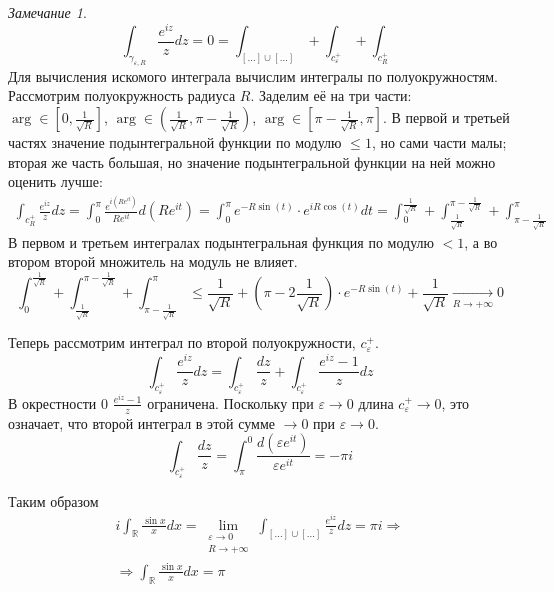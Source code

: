 \documentclass[12pt]{article}
\newcommand{\R}{\mathbb{R}}
\newcommand{\union}{\cup}
\newcommand{\Ra}{\Rightarrow}
\theoremstyle{thmnote}
\theoremstyle{remark}
\newtheorem*{remark}{Замечание}
\theoremstyle{defnote}
\begin{document}
\begin{remark}
    \begin{equation*}
        \int_{\gamma_{\varepsilon, R}} \frac{e^{iz}}{z} dz = 0 = \int_{[\hdots] \union [\hdots]} + \int_{c_\varepsilon^+} + \int_{c_R^+}
    \end{equation*}
    Для вычисления искомого интеграла вычислим интегралы по полуокружностям. Рассмотрим полуокружность радиуса $R$. Заделим её на три части: $\arg \in [0, \frac{1}{\sqrt{R}}]$, $\arg \in (\frac{1}{\sqrt{R}}, \pi - \frac{1}{\sqrt{R}})$, $\arg \in [\pi - \frac{1}{\sqrt{R}}, \pi]$. В первой и третьей частях значение подынтегральной функции по модулю $\leq 1$, но сами части малы; вторая же часть большая, но значение подынтегральной функции на ней можно оценить лучше:
    \begin{gather*}
        \int_{c_R^+} \frac{e^{iz}}{z} dz = \int_{0}^{\pi} \frac{e^{i(Re^{it})}}{Re^{it}} d(Re^{it}) = \int_{0}^{\pi} e^{-R \sin(t)} \cdot e^{iR \cos(t)} dt = \int_{0}^{\frac{1}{\sqrt{R}}} + \int_{\frac{1}{\sqrt{R}}}^{\pi - \frac{1}{\sqrt{R}}} + \int_{\pi - \frac{1}{\sqrt{R}}}^{\pi}
    \end{gather*}
    В первом и третьем интегралах подынтегральная функция по модулю $<1$, а во втором второй множитель на модуль не влияет.
    \begin{equation*}
        \int_{0}^{\frac{1}{\sqrt{R}}} + \int_{\frac{1}{\sqrt{R}}}^{\pi - \frac{1}{\sqrt{R}}} + \int_{\pi - \frac{1}{\sqrt{R}}}^{\pi} \leq \frac{1}{\sqrt{R}} + \left(\pi - 2 \frac{1}{\sqrt{R}}\right) \cdot e^{-R \sin(t)} + \frac{1}{\sqrt{R}} \underset{R \to +\infty}{\longrightarrow} 0
    \end{equation*}

    Теперь рассмотрим интеграл по второй полуокружности, $c_\varepsilon^+$.
    \begin{equation*}
        \int_{c_\varepsilon^+} \frac{e^{iz}}{z} dz = \int_{c_\varepsilon^+} \frac{dz}{z} + \int_{c_\varepsilon^+} \frac{e^{iz} - 1}{z} dz
    \end{equation*}
    В окрестности 0 $\frac{e^{iz} - 1}{z}$ ограничена. Поскольку при $\varepsilon \to 0$ длина $c_\varepsilon^+ \to 0$, это означает, что второй интеграл в этой сумме $\to 0$ при $\varepsilon \to 0$.
    \begin{equation*}
        \int_{c_\varepsilon^+} \frac{dz}{z} = \int_{\pi}^{0} \frac{d(\varepsilon e^{it})}{\varepsilon e^{it}} = - \pi i
    \end{equation*}

    Таким образом
    \begin{gather*}
        i \int_\R \frac{\sin x}{x} dx = \lim_{\substack{\varepsilon \to 0 \\ R \to +\infty}} \int_{[\hdots] \union [\hdots]} \frac{e^{iz}}{z} dz = \pi i \Ra \\
        \Ra \int_\R \frac{\sin x}{x} dx = \pi
    \end{gather*}
\end{remark}
\end{document}
